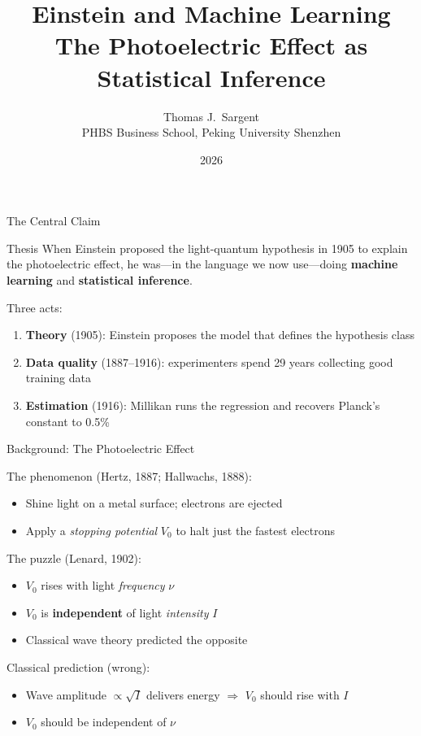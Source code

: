 \documentclass[aspectratio=169]{beamer}
\title{Einstein and Machine Learning \\
{\normalsize The Photoelectric Effect as Statistical Inference}}
\author{Thomas J.\ Sargent \\ PHBS  Business School, Peking University Shenzhen }
\date{2026}
\begin{document}

\begin{frame}
  \titlepage
\end{frame}

\begin{frame}{The Central Claim}

\begin{block}{Thesis}
When Einstein proposed the light-quantum hypothesis in 1905 to explain
the photoelectric effect, he was---in the language we now use---doing
\textbf{machine learning} and \textbf{statistical inference}.
\end{block}

\bigskip
Three acts:
\begin{enumerate}
  \item \textbf{Theory} (1905): Einstein proposes the model that defines
    the hypothesis class
  \item \textbf{Data quality} (1887--1916): experimenters spend 29 years
    collecting good training data
  \item \textbf{Estimation} (1916): Millikan runs the regression and
    recovers Planck's constant to 0.5\%
\end{enumerate}

\end{frame}

\begin{frame}{Background: The Photoelectric Effect}

The phenomenon (Hertz, 1887; Hallwachs, 1888):
\begin{itemize}
  \item Shine light on a metal surface; electrons are ejected
  \item Apply a \emph{stopping potential} $V_0$ to  halt just the
    fastest electrons
\end{itemize}

\medskip
The puzzle (Lenard, 1902):
\begin{itemize}
  \item $V_0$ rises with light \emph{frequency} $\nu$
  \item $V_0$ is \textbf{independent} of light \emph{intensity} $I$
  \item Classical wave theory predicted the opposite
\end{itemize}

\medskip
Classical prediction (wrong):
\begin{itemize}
  \item Wave amplitude $\propto \sqrt{I}$ delivers energy
    $\Rightarrow$ $V_0$ should rise with $I$
  \item $V_0$ should be independent of $\nu$
\end{itemize}

\end{frame}
\end{document}
